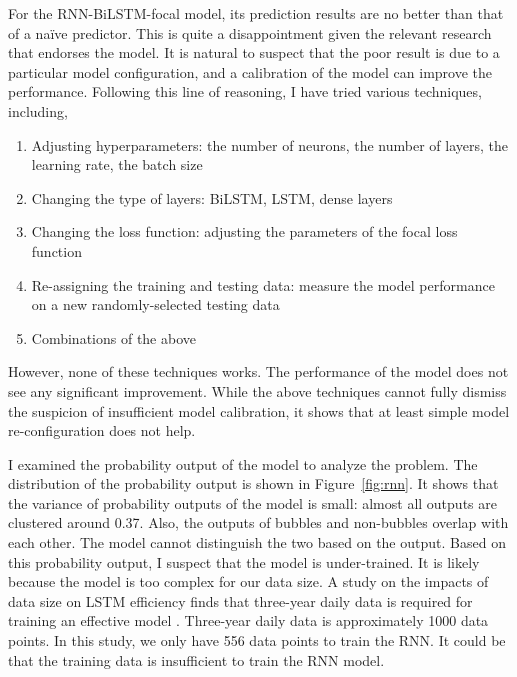 \documentclass[12pt, man, a4paper, floatsintext]{apa7}
\begin{document}
For the RNN-BiLSTM-focal model, its prediction results are no better than that of a naïve predictor. This is quite a disappointment given the relevant research that endorses the model. It is natural to suspect that the poor result is due to a particular model configuration, and a calibration of the model can improve the performance. Following this line of reasoning, I have tried various techniques, including,

\begin{enumerate}
    \item Adjusting hyperparameters: the number of neurons, the number of layers, the learning rate, the batch size
    \item Changing the type of layers: BiLSTM, LSTM, dense layers
    \item Changing the loss function: adjusting the parameters of the focal loss function
    \item Re-assigning the training and testing data: measure the model performance on a new randomly-selected testing data
    \item Combinations of the above
\end{enumerate}

However, none of these techniques works. The performance of the model does not see any significant improvement. While the above techniques cannot fully dismiss the suspicion of insufficient model calibration, it shows that at least simple model re-configuration does not help.

I examined the probability output of the model to analyze the problem. The distribution of the probability output is shown in Figure~\ref{fig:rnn}. It shows that the variance of probability outputs of the model is small: almost all outputs are clustered around 0.37. Also, the outputs of bubbles and non-bubbles overlap with each other. The model cannot distinguish the two based on the output. Based on this probability output, I suspect that the model is under-trained. It is likely because the model is too complex for our data size. A study on the impacts of data size on LSTM efficiency finds that three-year daily data is required for training an effective model \parencite{datasize}. Three-year daily data is approximately 1000 data points. In this study, we only have 556 data points to train the RNN. It could be that the training data is insufficient to train the RNN model. 
\end{document}
